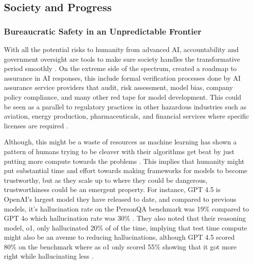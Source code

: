 \subsection{Society and Progress}

\subsubsection{Bureaucratic Safety in an Unpredictable Frontier}
With all the potential risks to humanity from advanced AI, accountability and government oversight are tools to make sure society handles the transformative period smoothly \citep{government_of_the_united_kingdom_roadmap_2021}. On the extreme side of the spectrum, \cite{government_of_the_united_kingdom_roadmap_2021} created a roadmap to assurance in AI responses, this include formal verification processes done by AI assurance service providers that audit, risk assessment, model bias, company policy compliance, and many other red tape for model development. This could be seen as a parallel to regulatory practices in other hazardous industries such as aviation, energy production, pharmaceuticals, and financial services where specific licenses are required \citep{anderljung_frontier_2023}. 

Although, this might be a waste of resources as machine learning has shown a pattern of humans trying to be cleaver with their algorithms get beat by just putting more compute towards the problems \citep{sutton_bitter_2019}. This implies that humanity might put substantial time and effort towards making frameworks for models to become trustworthy, but as they scale up to where they could be dangerous, trustworthiness could be an emergent property. For instance, GPT 4.5 is OpenAI's largest model they have released to date, and compared to previous models, it's hallucination rate on the PersonQA benchmark was 19\% compared to GPT 4o which hallucination rate was 30\% \citep{openai_gpt-4_2025}. They also noted that their reasoning model, o1, only hallucinated 20\% of of the time, implying that test time compute might also be an avenue to reducing hallucinations, although GPT 4.5 scored 80\% on the benchmark where as o1 only scored 55\% showing that it got more right while hallucinating less \citep{openai_gpt-4_2025}.

